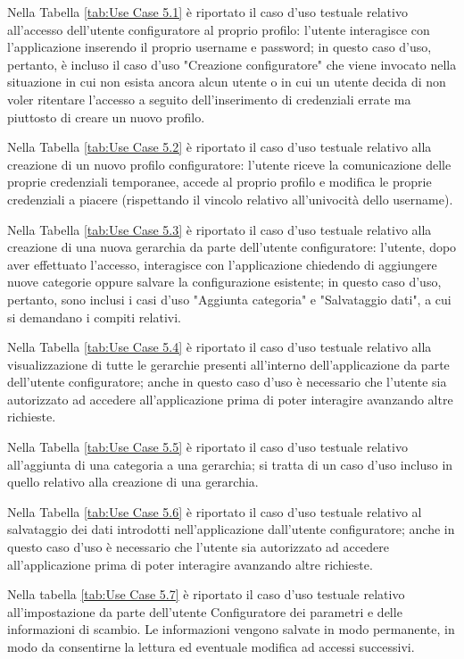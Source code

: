 Nella Tabella \ref{tab:Use Case 5.1} è riportato il caso d'uso testuale relativo all'accesso dell'utente configuratore al proprio profilo: l'utente interagisce con l'applicazione inserendo il proprio username e password; in questo caso d'uso, pertanto, è incluso il caso d'uso "Creazione configuratore" che viene invocato nella situazione in cui non esista ancora alcun utente o in cui un utente decida di non voler ritentare l'accesso a seguito dell'inserimento di credenziali errate ma piuttosto di creare un nuovo profilo.\bigskip

Nella Tabella \ref{tab:Use Case 5.2} è riportato il caso d'uso testuale relativo alla creazione di un nuovo profilo configuratore: l'utente riceve la comunicazione delle proprie credenziali temporanee, accede al proprio profilo e modifica le proprie credenziali a piacere (rispettando il vincolo relativo all'univocità dello username).\bigskip

Nella Tabella \ref{tab:Use Case 5.3} è riportato il caso d'uso testuale relativo alla creazione di una nuova gerarchia da parte dell'utente configuratore: l'utente, dopo aver effettuato l'accesso, interagisce con l'applicazione chiedendo di aggiungere nuove categorie oppure salvare la configurazione esistente; in questo caso d'uso, pertanto, sono inclusi i casi d'uso "Aggiunta categoria" e "Salvataggio dati", a cui si demandano i compiti relativi.\bigskip

Nella Tabella \ref{tab:Use Case 5.4} è riportato il caso d'uso testuale relativo alla visualizzazione di tutte le gerarchie presenti all'interno dell'applicazione da parte dell'utente configuratore; anche in questo caso d'uso è necessario che l'utente sia autorizzato ad accedere all'applicazione prima di poter interagire avanzando altre richieste.\bigskip

Nella Tabella \ref{tab:Use Case 5.5} è riportato il caso d'uso testuale relativo all'aggiunta di una categoria a una gerarchia; si tratta di un caso d'uso incluso in quello relativo alla creazione di una gerarchia.\bigskip

Nella Tabella \ref{tab:Use Case 5.6} è riportato il caso d'uso testuale relativo al salvataggio dei dati introdotti nell'applicazione dall'utente configuratore; anche in questo caso d'uso è necessario che l'utente sia autorizzato ad accedere all'applicazione prima di poter interagire avanzando altre richieste.\bigskip

Nella tabella \ref{tab:Use Case 5.7} è riportato il caso d'uso testuale relativo all'impostazione da parte dell'utente Configuratore dei parametri e delle informazioni di scambio. Le informazioni vengono salvate in modo permanente, in modo da consentirne la lettura ed eventuale modifica ad accessi successivi.\bigskip

